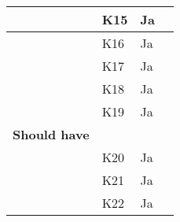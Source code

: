 \documentclass[class=article, crop=false]{standalone}
\begin{document}
\begin{table}[H]
\begin{tabularx}{\textwidth}{|l|l|l|X|}
            & K15      & Ja                 &                                                                                                                                                                                                    \\ \hline
            & K16      & Ja                 &                                                                                                                                                                                                    \\ \hline
            & K17      & Ja                 &                                                                                                                                                                                                    \\ \hline
            & K18      & Ja                 &                                                                                                                                                                                                    \\ \hline
            & K19      & Ja                 &                                                                                                                                                                                                    \\ \hline
            \textbf{Should have}     &          &                    &                                                                                                                                                                                                    \\ \hline
            & K20      & Ja                 &                                                                                                                                                                                                    \\ \hline
            & K21      & Ja                 &                                                                                                                                                                                                    \\ \hline
            & K22      & Ja                 &                                                                                                                                                                                                    \\ \hline

\end{tabularx}
\end{table}
\end{document}
